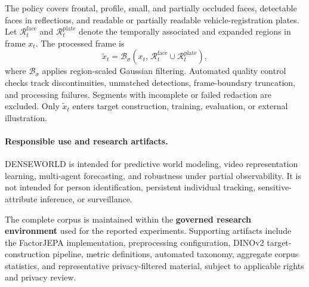 The policy covers frontal, profile, small, and partially occluded faces,
detectable faces in reflections, and readable or partially readable
vehicle-registration plates. Let
\(\mathcal R_t^{\mathrm{face}}\) and
\(\mathcal R_t^{\mathrm{plate}}\) denote the temporally associated and
expanded regions in frame \(x_t\). The processed frame is
\begin{equation*}
\widetilde{x}_t
=
\mathcal B_{\sigma}
\left(
x_t,\,
\mathcal R_t^{\mathrm{face}}
\cup
\mathcal R_t^{\mathrm{plate}}
\right),
\end{equation*}
where \(\mathcal B_{\sigma}\) applies region-scaled Gaussian filtering.
Automated quality control checks track discontinuities, unmatched
detections, frame-boundary truncation, and processing failures.
Segments with incomplete or failed redaction are excluded. Only
\(\widetilde{x}_t\) enters target construction, training, evaluation,
or external illustration.

\paragraph{Responsible use and research artifacts.}
DENSEWORLD is intended for predictive world modeling, video
representation learning, multi-agent forecasting, and robustness under
partial observability. It is not intended for person identification,
persistent individual tracking, sensitive-attribute inference, or
surveillance.

The complete corpus is maintained within the \textbf{governed research
environment} used for the reported experiments. Supporting artifacts
include the FactorJEPA implementation, preprocessing configuration,
DINOv2 target-construction pipeline, metric definitions, automated
taxonomy, aggregate corpus statistics, and representative
privacy-filtered material, subject to applicable rights and privacy
review.

























































